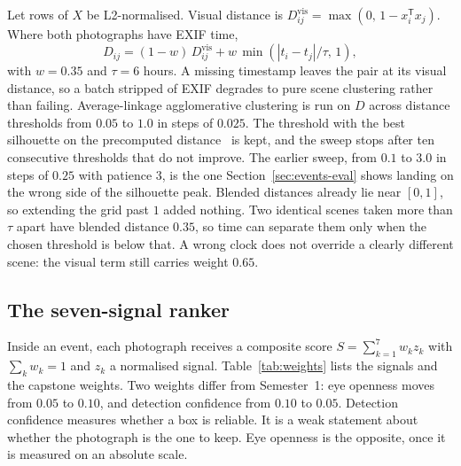 \documentclass[conference]{IEEEtran}
\begin{document}
Let rows of $X$ be
L2-normalised. Visual distance is $D^{\mathrm{vis}}_{ij}=\max(0,\,1-x_i^{\mathsf T}x_j)$.
Where both photographs have EXIF time,
\begin{equation}
D_{ij}
=
(1-w)\,D^{\mathrm{vis}}_{ij}
+
w\,\min\!\left(|t_i-t_j|/\tau,\,1\right),
\label{eq:time}
\end{equation}
with $w=0.35$ and $\tau=6$ hours. A missing timestamp leaves the pair at its
visual distance, so a batch stripped of EXIF degrades to pure scene clustering
rather than failing. Average-linkage agglomerative clustering is run on $D$
across distance thresholds from $0.05$ to $1.0$ in steps of $0.025$. The
threshold with the best silhouette on the precomputed
distance~\cite{rousseeuw1987silhouettes} is kept, and the sweep stops after
ten consecutive thresholds that do not improve. The earlier sweep, from $0.1$
to $3.0$ in steps of $0.25$ with patience $3$, is the one Section~\ref{sec:events-eval}
shows landing on the wrong side of the silhouette peak. Blended distances
already lie near $[0,1]$, so extending the grid past $1$ added nothing.
Two identical scenes taken more than $\tau$ apart have blended distance
$0.35$, so time can separate them only when the chosen threshold is below that.
A wrong clock does not override a clearly different scene: the visual term
still carries weight $0.65$.


\subsection{The seven-signal ranker}
\label{sec:rank}

Inside an event, each photograph receives a composite score
$S=\sum_{k=1}^{7} w_k z_k$ with $\sum_k w_k=1$ and $z_k$ a normalised signal.
Table~\ref{tab:weights} lists the signals and the capstone weights. Two weights
differ from Semester~1: eye openness moves from $0.05$ to $0.10$, and detection
confidence from $0.10$ to $0.05$. Detection confidence measures whether a box
is reliable. It is a weak statement about whether the photograph is the one to
keep. Eye openness is the opposite, once it is measured on an absolute scale.
\end{document}
